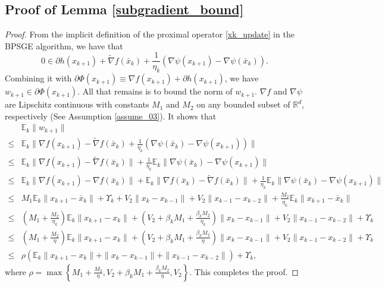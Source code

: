 \documentclass[letterpaper]{article} %
\begin{document}
	\subsection{Proof of  Lemma \ref{subgradient_bound}}
	\begin{proof}
		From the implicit deﬁnition of the proximal operator \eqref{xk_update} in the BPSGE algorithm, we have that
		\[
		0\in \partial h(x_{k+1}) +\tilde{\nabla}f(\bar{x}_{k})+\frac{1}{\eta_{k}}(\nabla \psi(x_{k+1})-\nabla \psi(\bar{x}_{k})).
		\]
		Combining it with  $\partial \Phi(x_{k+1})\equiv\nabla f(x_{k+1})+\partial h(x_{k+1})$,   we have $w_{k+1}\in \partial \Phi(x_{k+1})$. All that remains is to bound the norm of $w_{k+1}$.  $\nabla f$ and $\nabla \psi$ are Lipschitz continuous  with constants $M_{1}$ and $M_{2}$ on any bounded subset of $\mathbb{R}^{d}$, respectively (See Assumption \ref{assume_03}). It shows that
		\begin{align*}
			&\mathbb{E}_{k}\|w_{k+1}\|\\
			\le&\mathbb{E}_{k}\|\nabla f(x_{k+1})-\tilde{\nabla}f(\bar{x}_{k})+\frac{1}{\eta_{k}}(\nabla \psi(\bar{x}_{k})-\nabla \psi(x_{k+1}))\|\\
			\le&\mathbb{E}_{k}\|\nabla f(x_{k+1})-\tilde{\nabla}f(\bar{x}_{k})\|+\frac{1}{\eta_{k}}\mathbb{E}_{k}\|\nabla \psi(\bar{x}_{k})-\nabla \psi(x_{k+1})\|\\
			\le&\mathbb{E}_{k}\|\nabla f(x_{k+1})-\nabla f(\bar{x}_{k})\|+\mathbb{E}_{k}\|\nabla f(\bar{x}_{k})-\tilde{\nabla} f(\bar{x}_{k})\|+\frac{1}{\eta_{k}}\mathbb{E}_{k}\|\nabla \psi(\bar{x}_{k})-\nabla \psi(x_{k+1})\|\\
			\le&M_{1}\mathbb{E}_{k}\|x_{k+1}-\bar{x}_{k}\|+\Upsilon_{k}+V_{2}\|x_{k}-x_{k-1}\|+V_{2}\|x_{k-1}-x_{k-2}\|+\frac{M_{2}}{\eta_{k}}\mathbb{E}_{k}\|x_{k+1}-\bar{x}_{k}\|\\
			\le& \left(M_{1}+\frac{M_{2}}{\eta_{k}}\right)\mathbb{E}_{k}\|x_{k+1}-x_{k}\|+\left(V_{2}+\beta_{k}M_{1}+\frac{\beta_{k}M_{2}}{\eta_{k}}\right)\|x_{k}-x_{k-1}\|
			+V_{2}\|x_{k-1}-x_{k-2}\|+\Upsilon_{k}\\
			\le&\left(M_{1}+\frac{M_{2}}{\eta}\right)\mathbb{E}_{k}\|x_{k+1}-x_{k}\|+\left(V_{2}+\beta_{k}M_{1}+\frac{\beta_{k}M_{2}}{\eta}\right)\|x_{k}-x_{k-1}\|
			+V_{2}\|x_{k-1}-x_{k-2}\|+\Upsilon_{k}\\
			\le& \rho(\mathbb{E}_{k}\|x_{k+1}-x_{k}\|+\|x_{k}-x_{k-1}\|+\|x_{k-1}-x_{k-2}\|) +\Upsilon_{k},
		\end{align*}
		where $\rho=\max\left\{M_{1}+\frac{M_{2}}{\eta}, V_{2}+\beta_{k}M_{1}+\frac{\beta_{k}M_{2}}{\eta}, V_{2}\right\}$. This completes the proof.
	\end{proof}
\end{document}
